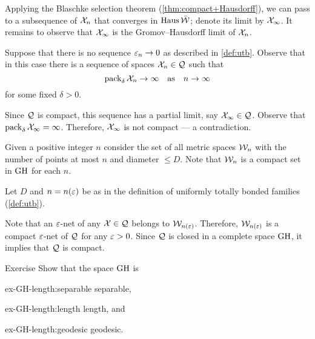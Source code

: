 Applying the Blaschke selection theorem (\ref{thm:compact+Hausdorff}),
we can pass to a subsequence of $\mathcal{X}_n$ that converges in $\operatorname{\rm Haus}\nolimits\bar{\mathcal{W}}$; denote its limit by $\mathcal{X}_\infty$.
It remains to observe that $\mathcal{X}_\infty$ is the Gromov--Hausdorff limit of $\mathcal{X}_n$.
\qeds

Suppose that there is no sequence $\varepsilon_n\to0$ as described in \ref{def:utb}.
Observe that in this case
there is a sequence of spaces $\mathcal{X}_n\in\mathcal{Q}$ such that 
$$\operatorname{\rm pack}\nolimits_\delta \mathcal{X}_n\to\infty
\quad\text{as}\quad
n\to\infty$$
for some fixed $\delta>0$.

Since $\mathcal{Q}$ is compact, 
this sequence has a partial limit, say $\mathcal{X}_\infty\in\mathcal{Q}$.
Observe that $\operatorname{\rm pack}\nolimits_{\delta} \mathcal{X}_\infty=\infty$.
Therefore, $\mathcal{X}_\infty$ is not compact --- a contradiction.

Given a positive integer $n$ consider the set of all metric spaces $\mathcal{W}_n$
with the number of points at most $n$ and diameter $\le D$.
Note that $\mathcal{W}_n$ is a compact set in $\operatorname{\rm GH}\nolimits$ for each $n$.

Let $D$ and $n=n(\varepsilon)$ be as in the definition of uniformly totally bonded families (\ref{def:utb}).

Note that an $\varepsilon$-net of any $\mathcal{X}\in\mathcal{Q}$ belongs to $\mathcal{W}_{n(\varepsilon)}$.
Therefore, $\mathcal{W}_{n(\varepsilon)}$ is a compact $\varepsilon$-net of $\mathcal{Q}$ for any $\varepsilon>0$.
Since $\mathcal{Q}$ is closed in a complete space $\operatorname{\rm GH}\nolimits$, it implies that $\mathcal{Q}$ is compact.
\qeds

\begin{thm}{Exercise}\label{ex-GH-length}
Show that the space $\operatorname{\rm GH}\nolimits$ is 
\begin{multicols}{3}

\begin{subthm}{ex-GH-length:separable}
separable,
\end{subthm}

\begin{subthm}{ex-GH-length:length}
length, and
\end{subthm}

\begin{subthm}{ex-GH-length:geodesic}
geodesic.
\end{subthm}

\end{multicols}


\end{thm}

